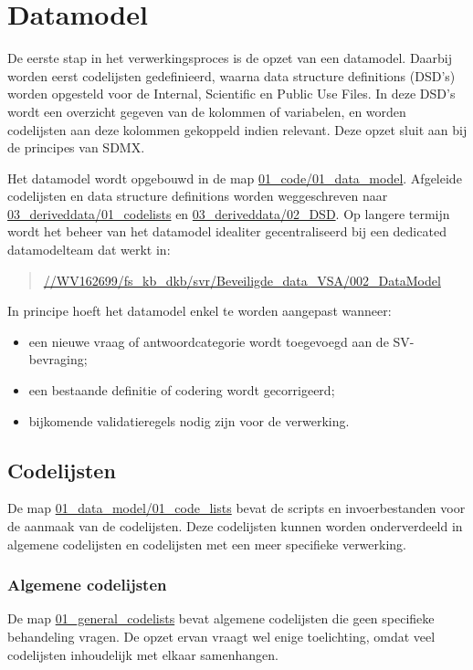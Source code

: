 \documentclass{VSAnote}
\begin{document}
\section{Datamodel}

De eerste stap in het verwerkingsproces is de opzet van een datamodel. Daarbij worden eerst codelijsten gedefinieerd, waarna data structure definitions (DSD's) worden opgesteld voor de Internal, Scientific en Public Use Files. In deze DSD's wordt een overzicht gegeven van de kolommen of variabelen, en worden codelijsten aan deze kolommen gekoppeld indien relevant. Deze opzet sluit aan bij de principes van SDMX.

Het datamodel wordt opgebouwd in de map \url{01_code/01_data_model}. Afgeleide codelijsten en data structure definitions worden weggeschreven naar \url{03_deriveddata/01_codelists} en \url{03_deriveddata/02_DSD}. Op langere termijn wordt het beheer van het datamodel idealiter gecentraliseerd bij een dedicated datamodelteam dat werkt in:
\begin{quote}
\url{//WV162699/fs_kb_dkb/svr/Beveiligde_data_VSA/002_DataModel}
\end{quote}

In principe hoeft het datamodel enkel te worden aangepast wanneer:
\begin{itemize}[nosep]
\item een nieuwe vraag of antwoordcategorie wordt toegevoegd aan de SV-bevraging;
\item een bestaande definitie of codering wordt gecorrigeerd;
\item bijkomende validatieregels nodig zijn voor de verwerking.
\end{itemize}

\subsection{Codelijsten}
\label{sec:codelijsten}

De map \url{01_data_model/01_code_lists} bevat de scripts en invoerbestanden voor de aanmaak van de codelijsten. Deze codelijsten kunnen worden onderverdeeld in algemene codelijsten en codelijsten met een meer specifieke verwerking.

\subsubsection{Algemene codelijsten}

De map \url{01_general_codelists} bevat algemene codelijsten die geen specifieke behandeling vragen. De opzet ervan vraagt wel enige toelichting, omdat veel codelijsten inhoudelijk met elkaar samenhangen.
\end{document}
